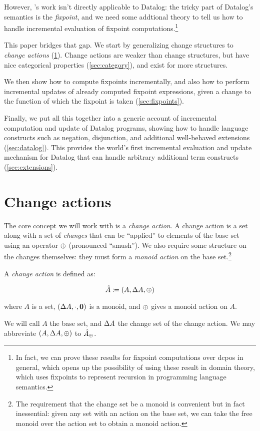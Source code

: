 However, \citeauthor{cai2014changes}'s work isn't directly applicable to Datalog: the tricky part
of Datalog's semantics is the \emph{fixpoint}, and we need some addtional theory to tell us how to
handle incremental evaluation of fixpoint computations.\footnote{In fact, we can prove these
results for fixpoint computations over dcpos in general, which opens up the
possibility of using these result in domain theory, which uses fixpoints to
represent recursion in programming language semantics.}

This paper bridges that gap. We start by generalizing change structures to
\emph{change actions} (\cref{sec:changeActions}). Change actions are weaker than change structures, but
have nice categorical properties (\cref{sec:category}), and exist for more structures.

We then show how to compute fixpoints incrementally, and also how to perform
incremental updates of already computed fixpoint expressions, given a change to
the function of which the fixpoint is taken (\cref{sec:fixpoints}).

Finally, we put all this together into a generic account of incremental
computation and update of Datalog programs, showing how to handle 
language constructs such as negation, disjunction, and additional well-behaved
extensions (\cref{sec:datalog}). This provides the world's first incremental
evaluation and update mechanism for Datalog that can handle arbitrary additional
term constructs (\cref{sec:extensions}).

\section{Change actions}
\label{sec:changeActions}

The core concept we will work with is a \emph{change action}. A change action is
a set along with a set of \emph{changes} that can be ``applied'' to elements of
the base set using an operator $\oplus$ (pronounced ``smush''). We also require
some structure on the changes themselves: they must form a \emph{monoid action}
on the base set.\footnote{The requirement that the change set be a monoid is convenient but in
  fact inessential: given any set with an action on the base set, we can take the
  free monoid over the action set to obtain a monoid action.}

\begin{defn}
  A \emph{change action} is defined as:

  \begin{displaymath}
    \hat{A} \coloneqq (A,\Delta A,\oplus)
  \end{displaymath}

  where $A$ is a set, $(\Delta A, \cdot, \textbf{0})$ is a monoid, and $\oplus$ gives a monoid action on $A$.

  We will call $A$ the base set, and $\Delta A$ the change set of the change
  action. We may abbreviate $(A,\Delta A,\oplus)$ to $\hat{A}_\oplus$.
\end{defn}

